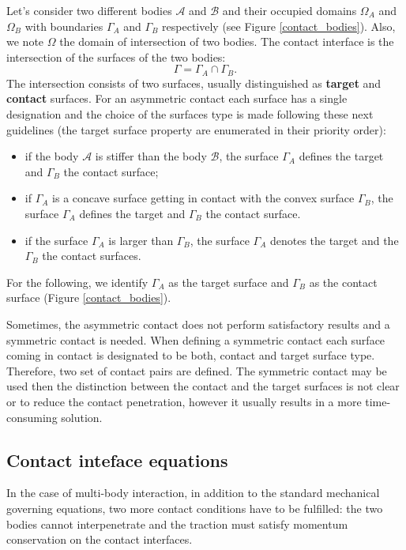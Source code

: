 Let's consider two different bodies $\mathcal{A}$ and $\mathcal{B}$ and their occupied domains $\Omega_A$ and $\Omega_B$ with boundaries $\Gamma_A$ and $\Gamma_B$ respectively (see Figure \ref{contact_bodies}). Also, we note $\Omega$ the domain of intersection of two bodies. The contact interface is the intersection of the surfaces of the two bodies:
$$\Gamma = \Gamma_A \cap \Gamma_B.$$
The intersection consists of two surfaces, usually distinguished as \textbf{target} and \textbf{contact} surfaces. For an asymmetric contact each surface has a single designation and the choice of the surfaces type is made following these next guidelines (the target surface property are enumerated in their priority order):
\begin{itemize}
\item if the body $\mathcal{A}$ is stiffer than the body $\mathcal{B}$, the surface $\Gamma_A$ defines the target and $\Gamma_B$ the contact surface;
\item if $\Gamma_A$ is a concave surface getting in contact with the convex surface $\Gamma_B$, the surface $\Gamma_A$ defines the target and $\Gamma_B$ the contact surface.
\item if the surface $\Gamma_A$ is larger than $\Gamma_B$, the surface $\Gamma_A$ denotes the target and the $\Gamma_B$ the contact surfaces.
\end{itemize} 
For the following, we identify $\Gamma_A$ as the target surface and $\Gamma_B$ as the contact surface (Figure \ref{contact_bodies}). 

 Sometimes, the asymmetric contact does not perform satisfactory results and a symmetric contact is needed. When defining a symmetric contact each surface coming in contact is designated to be both, contact and target surface type. Therefore, two set of contact pairs are defined. The symmetric contact may be used then the distinction between the contact and the target surfaces is not clear or to reduce the contact penetration, however it usually results in a more time-consuming solution.



\subsection{Contact inteface equations}%
 In the case of multi-body interaction, in addition to the standard mechanical governing equations, two more contact conditions have to be fulfilled: the two bodies cannot interpenetrate and the traction must satisfy momentum conservation on the contact interfaces.
   


